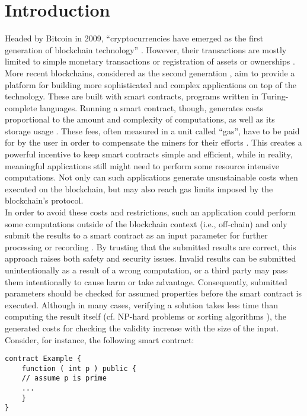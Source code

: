 \chapter{Introduction}\label{chap:introduction}
Headed by Bitcoin in 2009, ``cryptocurrencies have emerged as the first generation of blockchain technology'' \cite{alharby_blockchain_2017}. However, their transactions are mostly limited to simple monetary transactions or registration of assets or ownerships \cite{alharby_blockchain_2017}. More recent blockchains, considered as the second generation \cite{alharby_blockchain_2017}, aim to provide a platform for building more sophisticated and complex applications on top of the technology. These are built with smart contracts, programs written in Turing-complete languages. Running a smart contract, though, generates costs proportional to the amount and complexity of computations, as well as its storage usage \cite{alharby_blockchain_2017}. These fees, often measured in a unit called ``gas'', have to be paid for by the user in order to compensate the miners for their efforts \cite{chen_under-optimized_2020}. This creates a powerful incentive to keep smart contracts simple and efficient, while in reality, meaningful applications still might need to perform some resource intensive computations. Not only can such applications generate unsustainable costs when executed on the blockchain, but may also reach gas limits imposed by the blockchain's protocol. \\
In order to avoid these costs and restrictions, such an application could perform some computations outside of the blockchain context (i.e., off-chain) and only submit the results to a smart contract as an input parameter for further processing or recording \cite{thiemann_2020}. By trusting that the submitted results are correct, this approach raises both safety and security issues. Invalid results can be submitted unintentionally as a result of a wrong computation, or a third party may pass them intentionally to cause harm or take advantage. Consequently, submitted parameters should be checked for assumed properties before the smart contract is executed. Although in many cases, verifying a solution takes less time than computing the result itself (cf. NP-hard problems \cite{nph_problems} or sorting algorithms \cite{review_sorting}\cite{cpp_issorted}), the generated costs for checking the validity increase with the size of the input. \\
Consider, for instance, the following smart contract:
\begin{lstlisting}[caption=Smart contract expecting a prime number \cite{thiemann_2020}, numbers=none, language=Solidity, label=lst:prime]
contract Example {
	function ( int p ) public {
	// assume p is prime
	...
	}
}
\end{lstlisting}
